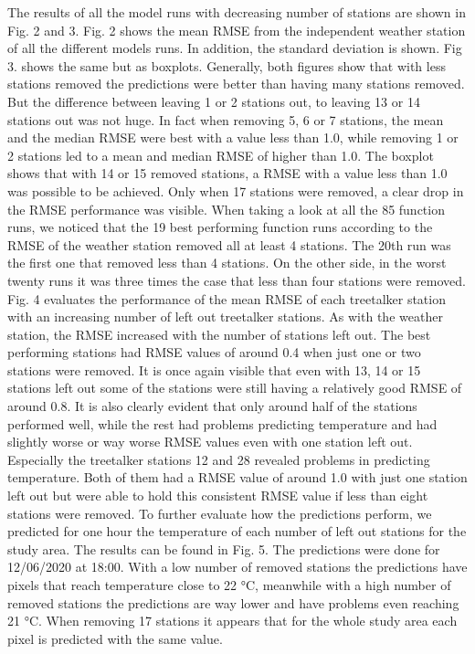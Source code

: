 \documentclass[5p]{elsarticle} %
\begin{document}
The results of all the model runs with decreasing number of stations are shown in Fig. 2 and 3. Fig. 2 shows the mean RMSE from the independent weather station of all the different models runs. In addition, the standard deviation is shown. Fig 3. shows the same but as boxplots. Generally, both figures show that with less stations removed the predictions were better than having many stations removed. But the difference between leaving 1 or 2 stations out, to leaving 13 or 14 stations out was not huge. In fact when removing 5, 6 or 7 stations, the mean and the median RMSE were best with a value less than 1.0, while removing 1 or 2 stations led to a mean and median RMSE of higher than 1.0. The boxplot shows that with 14 or 15 removed stations, a RMSE with a value less than 1.0 was possible to be achieved. Only when 17 stations were removed, a clear drop in the RMSE performance was visible.
When taking a look at all the 85 function runs, we noticed that the 19 best performing function runs according to the RMSE of the weather station removed all at least 4 stations. The 20th run was the first one that removed less than 4 stations. On the other side, in the worst twenty runs it was three times the case that less than four stations were removed. 
Fig. 4 evaluates the performance of the mean RMSE of each treetalker station with an increasing number of left out treetalker stations. As with the weather station, the RMSE increased with the number of stations left out. The best performing stations had RMSE values of around 0.4 when just one or two stations were removed. It is once again visible that even with 13, 14 or 15 stations left out some of the stations were still having a relatively good RMSE of around 0.8. It is also clearly evident that only around half of the stations performed well, while the rest had problems predicting temperature and had slightly worse or way worse RMSE values even with one station left out. Especially the treetalker stations 12 and 28 revealed problems in predicting temperature. Both of them had a RMSE value of around 1.0 with just one station left out but were able to hold this consistent RMSE value if less than eight stations were removed.
To further evaluate how the predictions perform, we predicted for one hour the temperature of each number of left out stations for the study area. The results can be found in Fig. 5. The predictions were done for 12/06/2020 at 18:00. With a low number of removed stations the predictions have pixels that reach temperature close to  22 °C, meanwhile with a high number of removed stations the predictions are way lower and have problems even reaching  21 °C. When removing 17 stations it appears that for the whole study area each pixel is predicted with the same value. 
\end{document}
